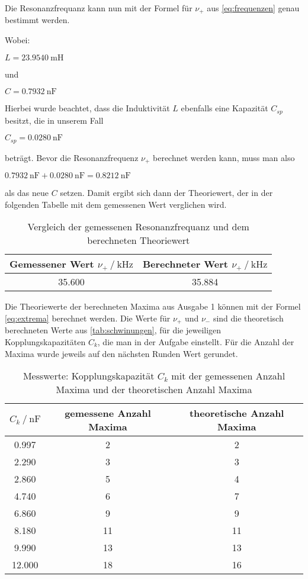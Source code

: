 Die Resonanzfrequanz kann nun mit der Formel für $\nu _+$ aus \autoref{eq:frequenzen} genau bestimmt werden.

Wobei:

$L = \SI{23.9540}{\milli\henry}$ 

und 

$C = \SI{0.7932}{\nano\farad}$

Hierbei wurde beachtet, dass die Induktivität $L$ ebenfalls eine Kapazität $C_{sp}$ besitzt, die in unserem Fall

$C_{sp} = \SI{0.0280}{\nano\farad}$ 

beträgt.
Bevor die Resonanzfrequenz $\nu _+$ berechnet werden kann, muss man also

$\SI{0.7932}{\nano\farad} + \SI{0.0280}{\nano\farad} = \SI{0.8212}{\nano\farad}$

als das neue $C$ setzen.
Damit ergibt sich dann der Theoriewert, der in der folgenden Tabelle mit dem gemessenen Wert verglichen wird.

\begin{table}
  \centering
  \caption{Vergleich der gemessenen Resonanzfrequanz und dem berechneten Theoriewert}
  \label{tab:resonanz}
  \begin{tabular}{c c}
    \toprule 
    Gemessener Wert $\nu _+ \:/\: \si{\kilo\hertz}$ & Berechneter Wert $\nu _+ \:/\: \si{\kilo\hertz}$    \\ 
    \midrule 
    35.600 & 35.884 \\
    \bottomrule
  \end{tabular}
\end{table}

Die Theoriewerte der berechneten Maxima aus Ausgabe 1 können mit der Formel \autoref{eq:extrema} berechnet werden. Die Werte für $\nu _+$ und $\nu _-$ sind die theoretisch berechneten Werte aus \autoref{tab:schwinungen}, für die jeweiligen Kopplungskapazitäten $C_k$, die man in der Aufgabe einstellt. Für die Anzahl der Maxima wurde jeweils auf den nächsten Runden Wert gerundet.

\begin{table}
  \centering
  \caption{Messwerte: Kopplungskapazität $C_k $ mit der gemessenen Anzahl Maxima und der theoretischen Anzahl Maxima }
  \label{tab:schwebungstheorie}
  \begin{tabular}{c c c}
    \toprule 
    $C_k \:/\: \si{\nano\farad}$ & gemessene Anzahl Maxima &  theoretische Anzahl Maxima   \\ 
    \midrule 
    0.997 & 2 & 2 \\
    2.290 & 3 & 3 \\
    2.860 & 5 & 4 \\
    4.740 & 6 & 7 \\
    6.860 & 9 & 9 \\
    8.180 & 11 & 11 \\
    9.990 & 13 & 13 \\
    12.000 & 18 & 16 \\
    \bottomrule
  \end{tabular}
\end{table}








